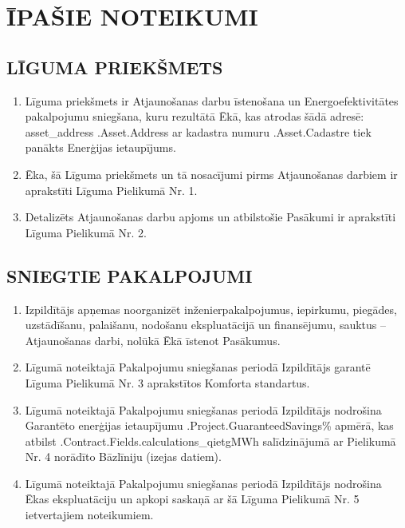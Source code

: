 \section{ĪPAŠIE NOTEIKUMI}
\subsection{LĪGUMA PRIEKŠMETS}
\begin{enumerate}
	\item Līguma priekšmets ir Atjaunošanas darbu īstenošana un Energoefektivitātes pakalpojumu sniegšana, kuru rezultātā Ēkā, kas atrodas šādā adresē: {{asset_address .Asset.Address}} ar kadastra numuru {{.Asset.Cadastre}} tiek panākts Enerģijas ietaupījums.
	\item Ēka, šā Līguma priekšmets un tā nosacījumi pirms Atjaunošanas darbiem ir aprakstīti Līguma Pielikumā Nr. 1.
	\item Detalizēts Atjaunošanas darbu apjoms un atbilstošie Pasākumi ir aprakstīti Līguma Pielikumā Nr. 2.
\end{enumerate}

\subsection{SNIEGTIE PAKALPOJUMI}
\begin{enumerate}
	\item Izpildītājs apņemas noorganizēt inženierpakalpojumus, iepirkumu, piegādes, uzstādīšanu, palaišanu, nodošanu ekspluatācijā un finansējumu, sauktus – Atjaunošanas darbi, nolūkā Ēkā īstenot Pasākumus.
	\item Līgumā noteiktajā Pakalpojumu sniegšanas periodā Izpildītājs garantē Līguma Pielikumā Nr. 3 aprakstītos Komforta standartus.
	\item Līgumā noteiktajā Pakalpojumu sniegšanas periodā Izpildītājs nodrošina Garantēto enerģijas ietaupījumu {{.Project.GuaranteedSavings}}\% apmērā, kas atbilst {{.Contract.Fields.calculations_qietg}}MWh salīdzinājumā ar Pielikumā Nr. 4 norādīto Bāzlīniju (izejas datiem).
	\item Līgumā noteiktajā Pakalpojumu sniegšanas periodā Izpildītājs nodrošina Ēkas ekspluatāciju un apkopi saskaņā ar šā Līguma Pielikumā Nr. 5 ietvertajiem noteikumiem.
\end{enumerate}

